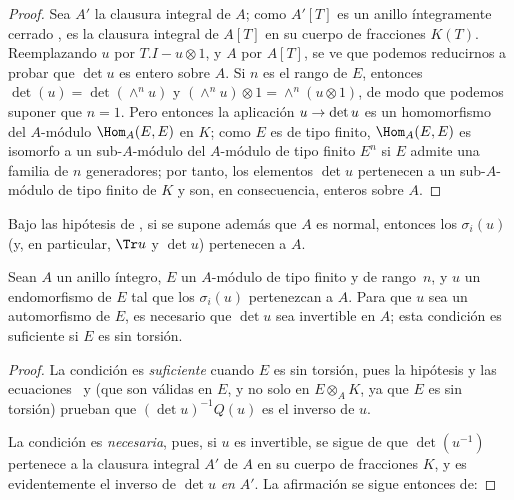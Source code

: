 \documentclass[oneside,10pt]{amsart}
\makeatletter
\newcommand{\ega@arrow}[2]{\mathchoice{#1}{#2}{#2}{#2}}
\renewcommand{\to}{\ega@arrow{\longrightarrow}{\rightarrow}}
\newcommand{\oldpage}[2][]{\marginnote{\normalfont\footnotesize\textbf{#1}~|~#2}\ignorespaces}
\let\EGAOriginalLabel\label
\renewcommand{\label}[1]{\phantomsection\EGAOriginalLabel{#1}}
\makeatother
\begin{document}
\begin{proof}
Sea $A'$ la clausura integral de $A$;
como $A'[T]$ es un anillo íntegramente cerrado \cite[p.~99]{II-24}, es la clausura integral de $A[T]$ en su cuerpo de fracciones $K(T)$.
Reemplazando $u$ por $T.I-u\otimes1$, y $A$ por $A[T]$, se ve que podemos reducirnos a probar que $\det u$ es entero sobre $A$.
Si $n$ es el rango de $E$, entonces $\det(u)=\det(\wedge^n u)$ y $(\wedge^n u)\otimes1=\wedge^n(u\otimes1)$, de modo que podemos suponer que $n=1$.
Pero entonces la aplicación $u\to\det u$ es un homomorfismo del $A$-módulo $\Hom_A(E,E)$ en $K$;
como $E$ es de tipo finito, $\Hom_A(E,E)$ es isomorfo a un sub-$A$-módulo del $A$-módulo de tipo finito $E^n$ si $E$ admite una familia de $n$ generadores; por tanto, los elementos $\det u$ pertenecen a un sub-$A$-módulo de tipo finito de $K$ y son, en consecuencia, enteros sobre $A$.
\end{proof}

\oldpage[II]{122}
\begin{corollary}[6.4.4]
\label{II.6.4.4}
Bajo las hipótesis de , si se supone además que $A$ es normal, entonces los $\sigma_i(u)$ (y, en particular, $\Tr u$ y $\det u$) pertenecen a $A$.
\end{corollary}

\begin{proposition}[6.4.5]
\label{II.6.4.5}
Sean $A$ un anillo íntegro, $E$ un $A$-módulo de tipo finito y de rango~$n$, y $u$ un endomorfismo de $E$ tal que los $\sigma_i(u)$ pertenezcan a $A$.
Para que $u$ sea un automorfismo de $E$, es necesario que $\det u$ sea invertible en $A$;
esta condición es suficiente si $E$ es sin torsión.
\end{proposition}

\begin{proof}
La condición es \emph{suficiente} cuando $E$ es sin torsión, pues la hipótesis y las ecuaciones~ y  (que son válidas en $E$, y no solo en $E\otimes_A K$, ya que $E$ es sin torsión) prueban que $(\det u)^{-1}Q(u)$ es el inverso de $u$.

La condición es \emph{necesaria}, pues, si $u$ es invertible, se sigue de  que $\det(u^{-1})$ pertenece a la clausura integral $A'$ de $A$ en su cuerpo de fracciones $K$, y es evidentemente el inverso de $\det u$ \emph{en} $A'$.
La afirmación se sigue entonces de:
\end{proof}
\end{document}
